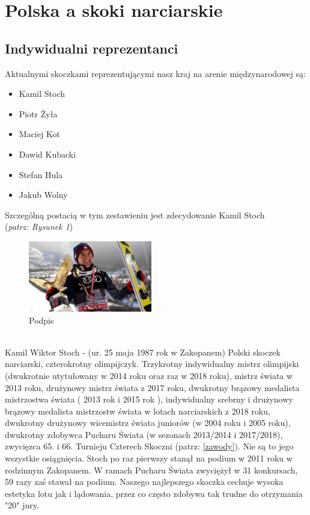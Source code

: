 \documentclass[11pt]{article}
\begin{document}
\section{Polska a skoki narciarskie}
\subsection{Indywidualni reprezentanci}
Aktualnymi skoczkami reprezentującymi nasz kraj na arenie międzynarodowej są:
\begin{itemize}
\item Kamil Stoch
\item Piotr Żyła
\item Maciej Kot
\item Dawid Kubacki
\item Stefan Hula
\item Jakub Wolny
\end{itemize}
\newpage
\noindent
Szczególną postacią w tym zestawieniu jest zdecydowanie Kamil Stoch\\(\textit{\small patrz: Rysunek 1})\label{kamil_stoch}
\begin{figure}
\begin{center}
\includegraphics[angle=45,width=0.48\textwidth]{Kamil.jpg}
\end{center}
\caption{Podpis}
\label{Etykieta}
\end{figure}
\\
Kamil Wiktor Stoch - (ur. 25 maja 1987 rok w Zakopanem) Polski skoczek narciarski, czterokrotny olimpijczyk. Trzykrotny indywidualny mistrz olimpijski (dwukrotnie utytułowany w 2014 roku oraz raz w 2018 roku), mistrz świata w 2013 roku, drużynowy mistrz świata z 2017 roku, dwukrotny brązowy medalista mistrzostwa świata ( 2013 rok i 2015 rok ), indywidualny srebrny i drużynowy brązowy medalista mistrzostw świata w lotach narciarskich z 2018 roku, dwukrotny drużynowy wicemistrz świata juniorów (w 2004 roku i 2005 roku), dwukrotny zdobywca Pucharu Świata (w sezonach 2013/2014 i 2017/2018), zwycięzca 65. i 66. Turnieju Czterech Skoczni (patrz: \ref{zawody}).
Nie są to jego wszystkie osiągnięcia. Stoch po raz pierwszy stanął na podium w 2011 roku w rodzinnym Zakopanem. W ramach Pucharu Świata zwyciężył w 31 konkursach, 59 razy zaś stawał na podium. Naszego najlepszego skoczka cechuje wysoka estetyka lotu jak i lądowania, przez co często zdobywa tak trudne do otrzymania "20" jury.
\end{document}
